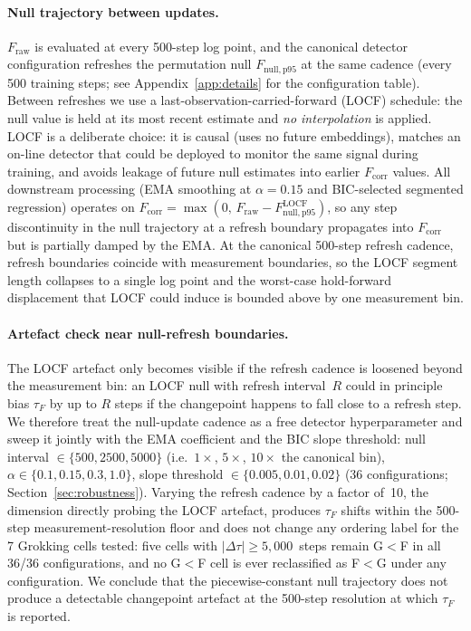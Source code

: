 \documentclass{article}
\newcommand{\tauf}{\tau_{F}}
\newcommand{\Dtau}{\Delta\tau}
\newcommand{\fcorr}{F_{\mathrm{corr}}}
\begin{document}
\paragraph{Null trajectory between updates.}
$F_{\mathrm{raw}}$ is evaluated at every 500-step log point, and the
canonical detector configuration refreshes the permutation null
$F_{\mathrm{null,p95}}$ at the same cadence (every 500 training
steps; see Appendix~\ref{app:details} for the configuration table).
Between refreshes we use a last-observation-carried-forward (LOCF)
schedule: the null value is held at its most recent estimate and
\emph{no interpolation} is applied.
LOCF is a deliberate choice: it is causal (uses no future
embeddings), matches an on-line detector that could be deployed to
monitor the same signal during training, and avoids leakage of
future null estimates into earlier $\fcorr$ values.
All downstream processing (EMA smoothing at $\alpha{=}0.15$ and
BIC-selected segmented regression) operates on
$\fcorr=\max(0,\,F_{\mathrm{raw}}-F_{\mathrm{null,p95}}^{\mathrm{LOCF}})$,
so any step discontinuity in the null trajectory at a refresh
boundary propagates into $\fcorr$ but is partially damped by the EMA.
At the canonical 500-step refresh cadence, refresh boundaries
coincide with measurement boundaries, so the LOCF segment length
collapses to a single log point and the worst-case hold-forward
displacement that LOCF could induce is bounded above by one
measurement bin.

\paragraph{Artefact check near null-refresh boundaries.}
The LOCF artefact only becomes visible if the refresh cadence is
loosened beyond the measurement bin: an LOCF null with refresh
interval~$R$ could in principle bias $\tauf$ by up to $R$ steps if
the changepoint happens to fall close to a refresh step.
We therefore treat the null-update cadence as a free detector
hyperparameter and sweep it jointly with the EMA coefficient and the
BIC slope threshold: null interval $\in\{500, 2500, 5000\}$ (i.e.\
$1\times$, $5\times$, $10\times$ the canonical bin),
$\alpha\in\{0.1, 0.15, 0.3, 1.0\}$,
slope threshold $\in\{0.005, 0.01, 0.02\}$
(36 configurations; Section~\ref{sec:robustness}).
Varying the refresh cadence by a factor of~10, the dimension
directly probing the LOCF artefact, produces $\tauf$ shifts within
the 500-step measurement-resolution floor and does not change any
ordering label for the 7 Grokking cells tested:
five cells with $|\Dtau|\geq5{,}000$~steps remain G$<$F in all
36/36 configurations, and no G$<$F cell is ever reclassified as F$<$G
under any configuration.
We conclude that the piecewise-constant null trajectory does not
produce a detectable changepoint artefact at the 500-step resolution
at which $\tauf$ is reported.
\end{document}
